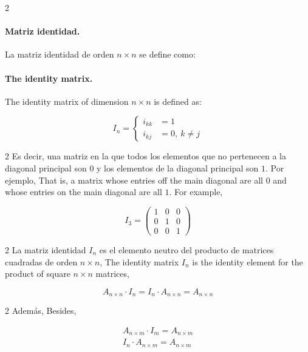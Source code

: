 \begin{paracol}{2}
\paragraph{Matriz identidad.} La matriz identidad de orden $n\times n$ se 
define como:
\switchcolumn
\paragraph{The identity matrix.} The identity matrix of dimension $n\times n$ is defined as:
\end{paracol}
\begin{equation*}
I_n= \left\{ 
\begin{aligned}
i_{kk}&=1\\
i_{kj}&=0, \ k\neq j
\end{aligned}
\right.
\end{equation*}

\begin{paracol}{2}
Es decir, una matriz en la que todos los elementos que no pertenecen a la diagonal principal son $0$ y los elementos de la diagonal principal son $1$. Por ejemplo,
\switchcolumn
That is, a matrix whose entries off the main diagonal are all $0$ and whose entries on the main diagonal are all $1$. For example,    
\end{paracol}

\begin{equation*}
I_3=\begin{pmatrix}
1& 0& 0\\
0& 1& 0\\
0& 0& 1
\end{pmatrix}
\end{equation*}

\begin{paracol}{2}
La matriz identidad $I_n$ es el elemento neutro del producto de matrices cuadradas de orden $n\times n$,
\switchcolumn
The identity matrix $I_n$ is the identity element for the product of square $n \times n$ matrices,    
\end{paracol}

\begin{equation*}
A_{n\times n}\cdot I_n=I_n\cdot A_{n\times n}=A_{n\times n}
\end{equation*}
\begin{paracol}{2}
Además,
\switchcolumn
Besides,
\end{paracol}
\begin{gather*}
A_{n\times m}\cdot I_m=A_{n \times m}\\
I_n\cdot A_{n\times m}=A_{n\times m}
\end{gather*}

